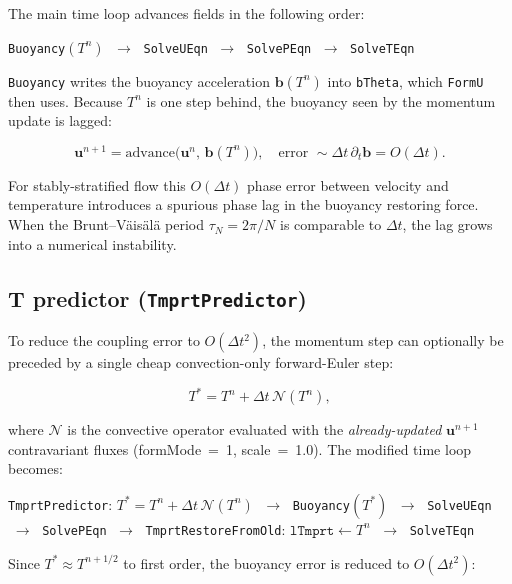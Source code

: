 \documentclass[12pt,a4paper]{article}
\begin{document}
The main time loop advances fields in the following order:

\begin{center}
\texttt{Buoyancy}$(T^n)$ $\;\to\;$
\texttt{SolveUEqn} $\;\to\;$
\texttt{SolvePEqn} $\;\to\;$
\texttt{SolveTEqn}
\end{center}

\texttt{Buoyancy} writes the buoyancy acceleration $\mathbf{b}(T^n)$ into
\texttt{bTheta}, which \texttt{FormU} then uses.  Because $T^n$ is one step
behind, the buoyancy seen by the momentum update is lagged:

\begin{equation}
  \mathbf{u}^{n+1}
  = \text{advance}\bigl(\mathbf{u}^n,\,\mathbf{b}(T^n)\bigr),
  \quad\text{error }\sim \Delta t\,\partial_t\mathbf{b} = O(\Delta t).
\end{equation}

For stably-stratified flow this $O(\Delta t)$ phase error between velocity
and temperature introduces a spurious phase lag in the buoyancy restoring
force.  When the Brunt--Väisälä period $\tau_N = 2\pi/N$ is comparable to
$\Delta t$, the lag grows into a numerical instability.

\subsection*{T predictor (\texttt{TmprtPredictor})}

To reduce the coupling error to $O(\Delta t^2)$, the momentum step can
optionally be preceded by a single cheap convection-only forward-Euler step:

\begin{equation}
  T^* = T^n + \Delta t\,\mathcal{N}(T^n),
  \label{eq:Tpredictor}
\end{equation}

where $\mathcal{N}$ is the convective operator evaluated with the
\emph{already-updated} $\mathbf{u}^{n+1}$ contravariant fluxes
(formMode~=~1, scale~=~1.0).
The modified time loop becomes:

\begin{center}
\texttt{TmprtPredictor}: $T^*=T^n+\Delta t\,\mathcal{N}(T^n)$
$\;\to\;$
\texttt{Buoyancy}$(T^*)$
$\;\to\;$
\texttt{SolveUEqn}
$\;\to\;$
\texttt{SolvePEqn}
$\;\to\;$
\texttt{TmprtRestoreFromOld}: $\texttt{lTmprt}\leftarrow T^n$
$\;\to\;$
\texttt{SolveTEqn}
\end{center}

Since $T^* \approx T^{n+1/2}$ to first order,
the buoyancy error is reduced to $O(\Delta t^2)$:
\end{document}
